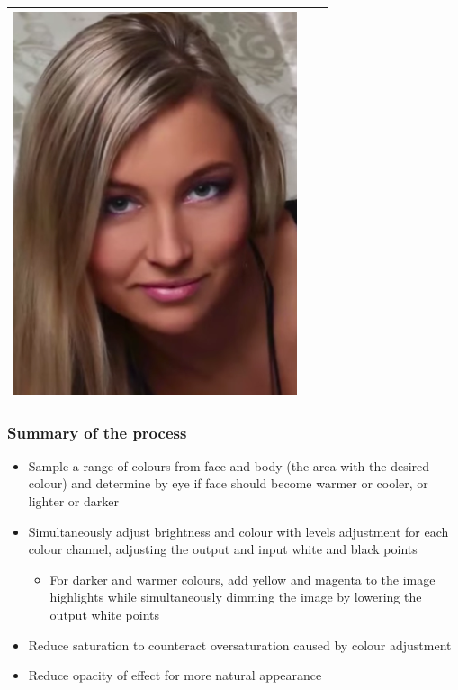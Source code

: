 \begin{longtable}{|c|c|c|}
\begin{minipage}{.29\textwidth}
    \includegraphics[width=\textwidth,height=\textheight,keepaspectratio]{images/match_body_res}
  \end{minipage} \\
    \hline
\end{longtable}

\subsubsection*{Summary of the process}
\begin{itemize}
  \item Sample a range of colours from face and body (the area with the desired colour) and determine by eye if face should become warmer or cooler, or lighter or darker
  \item Simultaneously adjust brightness and colour with levels adjustment for each colour channel, adjusting the output and input white and black points
    \begin{itemize}
      \item For darker and warmer colours, add yellow and magenta to the image highlights while simultaneously dimming the image by lowering the output white points
    \end{itemize}
  \item Reduce saturation to counteract oversaturation caused by colour adjustment
  \item Reduce opacity of effect for more natural appearance
\end{itemize}
\pagebreak

